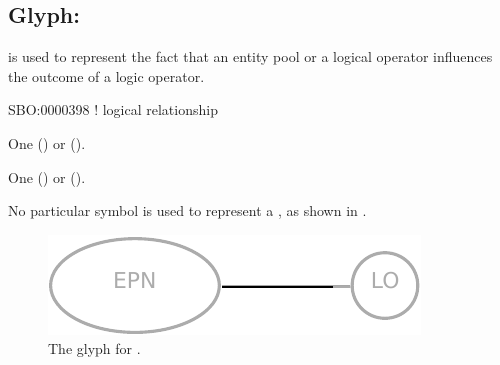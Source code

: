 \subsection{Glyph: }
\label{sec:logicArc}

 is used to represent the fact that an entity pool or a logical operator influences
the outcome of a logic operator.

\begin{glyphDescription}

\glyphSboTerm
SBO:0000398 ! logical relationship

\glyphOrigin
One  () or  ().

\glyphTarget
One  () or  ().

\glyphSymbol
No particular symbol is used to represent a , as shown in .

\end{glyphDescription}

\begin{figure}[H]
  \centering
  \includegraphics{images/build/logic_arc.pdf}
  \caption{The \PD glyph for .}
  \label{fig:logicArc}
\end{figure}
